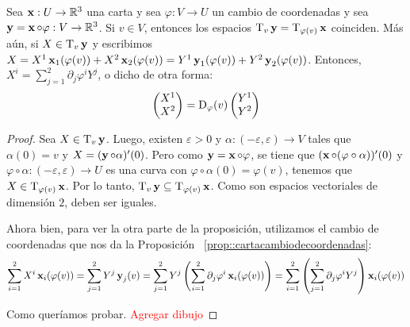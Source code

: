 \begin{prop}
Sea $\operatorname{\mathbf{x}}:U\to\mathbb{R}^3$ una carta y sea $\varphi:V\to U$ un cambio de coordenadas y sea $\operatorname{\mathbf{y}}=\operatorname{\mathbf{x}}\circ\varphi: V\to \mathbb{R}^3$. Si $v\in V$, entonces los espacios $\mathrm{T}_v\operatorname{\mathbf{y}} = \mathrm{T}_{\varphi(v)}\operatorname{\mathbf{x}}$ coinciden. Más aún, si $X\in\mathrm{T}_v\operatorname{\mathbf{y}}$ y escribimos $X = X^1\operatorname{\mathbf{x}}_1(\varphi(v)) + X^2\operatorname{\mathbf{x}}_2(\varphi(v)) = Y^1\operatorname{\mathbf{y}}_1(\varphi(v)) + Y^2\operatorname{\mathbf{y}}_2(\varphi(v))$. Entonces, $X^i = \displaystyle\sum_{j=1}^2 \partial_j\varphi^i Y^j$, o dicho de otra forma: $$\begin{pmatrix}X^1 \\ X^2\end{pmatrix} = \operatorname{\mathrm{D}}_\varphi(v)\begin{pmatrix}Y^1 \\ Y^2\end{pmatrix}$$
\begin{proof}
Sea $X\in\mathrm{T}_v\operatorname{\mathbf{y}}$. Luego, existen $\varepsilon>0$ y $\alpha:(-\varepsilon,\varepsilon)\to V$ tales que $\alpha(0)=v$ y $X=(\operatorname{\mathbf{y}}\circ\alpha)'(0)$. Pero como $\operatorname{\mathbf{y}}=\operatorname{\mathbf{x}}\circ\varphi$, se tiene que $(\operatorname{\mathbf{x}}\circ (\varphi\circ\alpha))'(0)$ y $\varphi\circ\alpha:(-\varepsilon,\varepsilon)\to U$ es una curva con $\varphi\circ\alpha(0)=\varphi(v)$, tenemos que $X\in\mathrm{T}_{\varphi(v)}\operatorname{\mathbf{x}}$. Por lo tanto, $\mathrm{T}_v\operatorname{\mathbf{y}}\subseteq\mathrm{T}_{\varphi(v)}\operatorname{\mathbf{x}}$. Como son espacios vectoriales de dimensión $2$, deben ser iguales.

Ahora bien, para ver la otra parte de la proposición, utilizamos el cambio de coordenadas que nos da la Proposición ~\ref{prop::cartacambiodecoordenadas}: $$\displaystyle\sum_{i=1}^2 X^i \operatorname{\mathbf{x}}_i(\varphi(v)) = \displaystyle\sum_{j=1}^2 Y^j \operatorname{\mathbf{y}}_j(v)=\displaystyle\sum_{j=1}^2 Y^j \left(\displaystyle\sum_{i=1}^2 \partial_j\varphi^i \operatorname{\mathbf{x}}_i(\varphi(v))\right) = \displaystyle\sum_{i=1}^2 \left(\displaystyle\sum_{j=1}^2 \partial_j\varphi^i Y^j\right)\operatorname{\mathbf{x}}_i(\varphi(v))$$

Como queríamos probar.
\textcolor{red}{Agregar dibujo}
\end{proof}
\end{prop}

